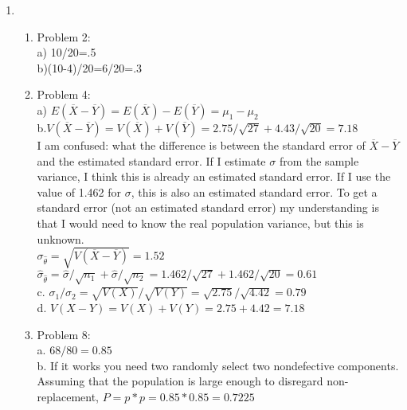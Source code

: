 \documentclass[11pt,letterpaper]{article}
\begin{document}
\begin{enumerate}
\item 
    \begin{enumerate}
        \item Problem 2: \\
        a) 10/20=.5 \\
        b)(10-4)/20=6/20=.3
        \item Problem 4: \\
        a) $E(\overline{X}-\overline{Y})=E(\overline{X})-E(\overline{Y})=\mu_1-\mu_2$\\
        b.$V(\overline{X}-\overline{Y})=V(\overline{X})+V(\overline{Y})=2.75/\sqrt{27}+4.43/\sqrt{20}=7.18$ \\
        I am confused: what the difference is between the standard error of $\overline{X}-\overline{Y}$ and the estimated standard error. If I estimate $\sigma$ from the sample variance, I think this is already an estimated standard error. If I use the value of 1.462 for $\sigma$, this is also an estimated standard error. To get a standard error (not an estimated standard error) my understanding is that I would need to know the real population variance, but this is unknown.\\
        $\sigma_{\hat{\theta}}=\sqrt{V(\overline{X}-\overline{Y})}=1.52$\\
        $\hat{\sigma}_{\hat{\theta}}=\hat{\sigma}/\sqrt{n_{1}}+\hat{\sigma}/\sqrt{n_{2}}=1.462/\sqrt{27}+1.462/\sqrt{20}=0.61$\\
        c. $\sigma_{1}/\sigma_{2}=\sqrt{V(X)}/\sqrt{V(Y)}=\sqrt{2.75}/\sqrt{4.42}=0.79$\\
        d. $V(X-Y)=V(X)+V(Y)=2.75+4.42=7.18$
        \item Problem 8:\\
        a. $68/80=0.85$\\
        b. If it works you need two randomly select two nondefective components. Assuming that the population is large enough to disregard non-replacement, $P=p*p=0.85*0.85=0.7225$
    \end{enumerate}

\end{enumerate}
\end{document}
